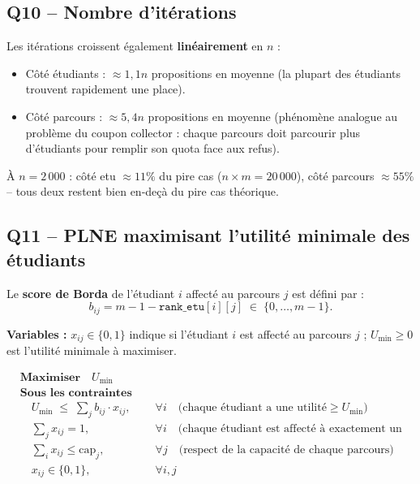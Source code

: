 \documentclass[11pt,a4paper]{article}
\begin{document}
\subsection*{Q10 -- Nombre d'itérations}

Les itérations croissent également \textbf{linéairement} en $n$ :
\begin{itemize}
  \item Côté étudiants : $\approx 1{,}1n$ propositions en moyenne (la plupart des étudiants trouvent rapidement une place).
  \item Côté parcours : $\approx 5{,}4n$ propositions en moyenne (phénomène analogue au problème du coupon collector : chaque parcours doit parcourir plus d'étudiants pour remplir son quota face aux refus).
\end{itemize}

À $n = 2\,000$ : côté etu $\approx 11\%$ du pire cas ($n \times m = 20\,000$), côté parcours $\approx 55\%$ -- tous deux restent bien en-deçà du pire cas théorique.

\subsection*{Q11 -- PLNE maximisant l'utilité minimale des étudiants}

Le \textbf{score de Borda} de l'étudiant $i$ affecté au parcours $j$ est défini par :
\[
  b_{ij} = m - 1 - \texttt{rank\_etu}[i][j] \;\in\; \{0, \ldots, m-1\}.
\]

\textbf{Variables :} $x_{ij} \in \{0,1\}$ indique si l'étudiant $i$ est affecté au parcours $j$ ; $U_{\min} \geq 0$ est l'utilité minimale à maximiser.

\bigskip
\begin{equation*}
\begin{aligned}
  &\textbf{Maximiser} \quad U_{\min} \\[6pt]
  &\textbf{Sous les contraintes :} \\[4pt]
  &\quad U_{\min} \;\leq\; \sum_{j} b_{ij} \cdot x_{ij}, && \forall i \quad \text{(chaque étudiant a une utilité} \geq U_{\min}\text{)} \\[4pt]
  &\quad \sum_{j} x_{ij} = 1, && \forall i \quad \text{(chaque étudiant est affecté à exactement un parcours)} \\[4pt]
  &\quad \sum_{i} x_{ij} \leq \mathrm{cap}_j, && \forall j \quad \text{(respect de la capacité de chaque parcours)} \\[4pt]
  &\quad x_{ij} \in \{0,1\}, && \forall i, j
\end{aligned}
\end{equation*}
\end{document}
